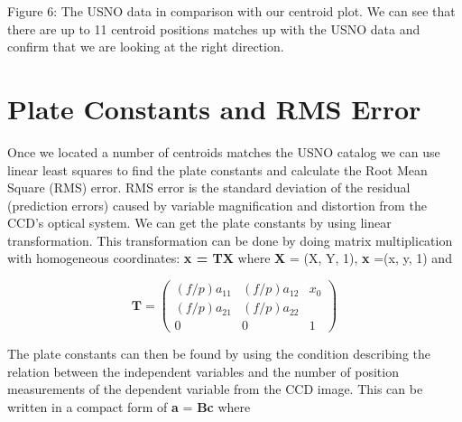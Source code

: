 \documentclass[onecolumn, 12pt, a4paper]{article}
\begin{document}
Figure 6: The USNO data in comparison with our centroid plot. We can see that there are up to 11 centroid positions matches up with the USNO data and confirm that we are looking at the right direction. \newline

\section{Plate Constants and RMS Error}
Once we located a number of centroids matches the USNO catalog we can use linear least squares to find the plate constants and calculate the Root Mean Square (RMS) error. RMS error is the standard deviation of the residual (prediction errors) caused by variable magnification and distortion from the CCD's optical system. We can get the plate constants by using linear transformation. This transformation can be done by doing matrix multiplication with homogeneous coordinates: \textbf{x = TX} where \textbf{X} = (X, Y, 1), \textbf{x} =(x, y, 1) and

\begin{equation}\label{eq:1}
\textbf{T} = 
\left(\begin{array}{ccc} (f/p)a_{11} & (f/p)a_{12} & x_{0}\\ (f/p)a_{21} & (f/p)a_{22}\\ 0&0&1 \end{array}\right)
\end{equation}

\leavevmode
\newline
The plate constants can then be found by using the condition describing the relation between the independent variables and the number of position measurements of the dependent variable from the CCD image. This can be written in a compact form of \textbf{a} = \textbf{Bc} where \newline

\end{document}
